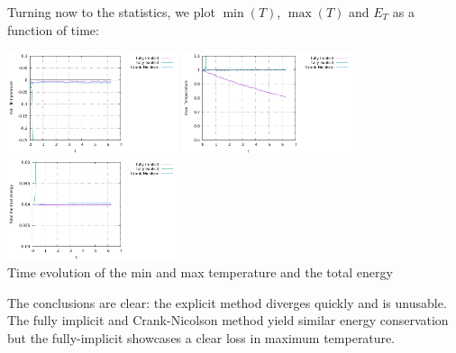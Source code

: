 \vspace{.4cm}

Turning now to the statistics, we plot $\min(T)$, $\max(T)$ and $E_T$ as a function of time:
\begin{center}
\includegraphics[width=5cm]{python_codes/fieldstone_43/results/experiment1/Tmin.pdf}
\includegraphics[width=5cm]{python_codes/fieldstone_43/results/experiment1/Tmax.pdf}
\includegraphics[width=5cm]{python_codes/fieldstone_43/results/experiment1/ET.pdf}\\
{\captionfont Time evolution of the min and max temperature and the total energy}
\end{center}
The conclusions are clear: the explicit method diverges quickly and is unusable. The fully implicit and Crank-Nicolson 
method yield similar energy conservation but the fully-implicit showcases a clear loss in maximum temperature.

